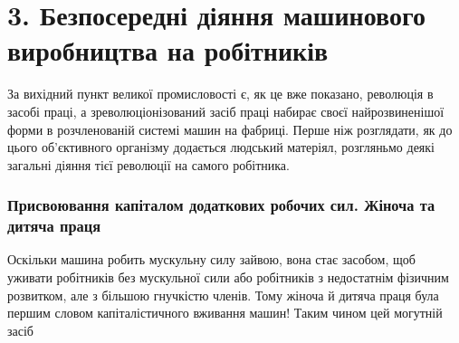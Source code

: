 \section*{3. Безпосередні діяння машинового виробництва на робітників}

За вихідний пункт великої промисловості є, як це вже
показано, революція в засобі праці, а зреволюціонізований засіб
праці набирає своєї найрозвиненішої форми в розчленованій
системі машин на фабриці. Перше ніж розглядати, як до цього
об’єктивного організму додається людський матеріял, розгляньмо
деякі загальні діяння тієї революції на самого робітника.

\subsubsection{Присвоювання капіталом додаткових робочих
сил. Жіноча та дитяча праця}

Оскільки машина робить мускульну силу зайвою, вона стає
засобом, щоб уживати робітників без мускульної сили або робітників
з недостатнім фізичним розвитком, але з більшою гнучкістю
членів. Тому жіноча й дитяча праця була першим словом капіталістичного
вживання машин! Таким чином цей могутній засіб
\parbreak{}  %
